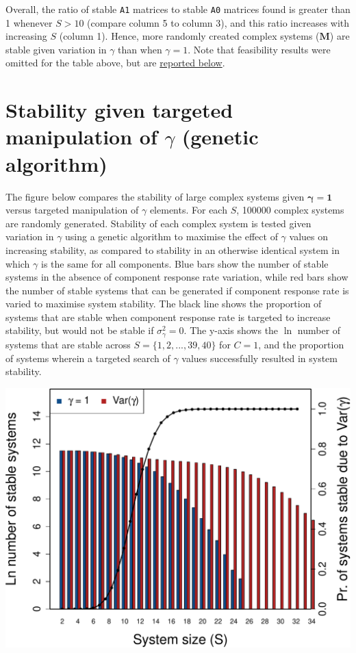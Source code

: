 \documentclass[]{article}
\begin{document}
Overall, the ratio of stable \texttt{A1} matrices to stable \texttt{A0}
matrices found is greater than 1 whenever \(S > 10\) (compare column 5
to column 3), and this ratio increases with increasing \(S\) (column 1).
Hence, more randomly created complex systems (\(\mathbf{M}\)) are stable
given variation in \(\gamma\) than when \(\gamma = 1\). Note that
feasibility results were omitted for the table above, but are
\protect\hyperlink{Feasibility}{reported below}.

\hypertarget{ga}{%
\section{\texorpdfstring{Stability given targeted manipulation of
\(\gamma\) (genetic
algorithm)}{Stability given targeted manipulation of \textbackslash{}gamma (genetic algorithm)}}\label{ga}}

The figure below compares the stability of large complex systems given
\(\boldsymbol{\gamma = 1}\) versus targeted manipulation of \(\gamma\)
elements. For each \(S\), 100000 complex systems are randomly generated.
Stability of each complex system is tested given variation in \(\gamma\)
using a genetic algorithm to maximise the effect of \(\gamma\) values on
increasing stability, as compared to stability in an otherwise identical
system in which \(\gamma\) is the same for all components. Blue bars
show the number of stable systems in the absence of component response
rate variation, while red bars show the number of stable systems that
can be generated if component response rate is varied to maximise system
stability. The black line shows the proportion of systems that are
stable when component response rate is targeted to increase stability,
but would not be stable if \(\sigma^{2}_{\gamma} = 0\). The y-axis shows
the \(\ln\) number of systems that are stable across
\(S = \{1, 2, ..., 39, 40\}\) for \(C = 1\), and the proportion of
systems wherein a targeted search of \(\gamma\) values successfully
resulted in system stability.

\includegraphics{SI_files/figure-latex/unnamed-chunk-6-1.pdf}
\end{document}
